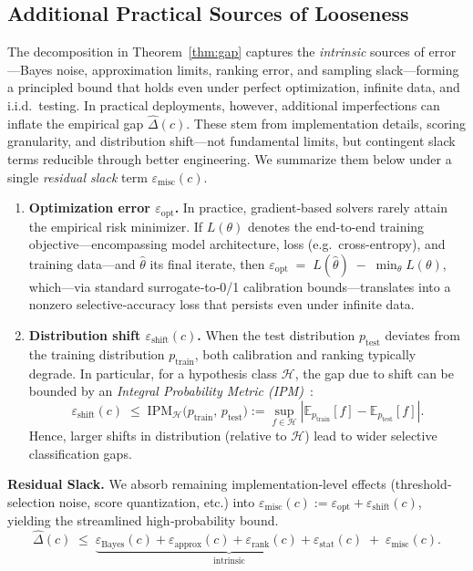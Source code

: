\subsection{Additional Practical Sources of Looseness}
\label{sec:extra-slack-short}
The decomposition in Theorem~\ref{thm:gap} captures the \emph{intrinsic} sources of error—Bayes noise, approximation limits, ranking error, and sampling slack—forming a principled bound that holds even under perfect optimization, infinite data, and i.i.d.\ testing. In practical deployments, however, additional imperfections can inflate the empirical gap \(\widehat{\Delta}(c)\). These stem from implementation details, scoring granularity, and distribution shift—not fundamental limits, but contingent slack terms reducible through better engineering. We summarize them below under a single \emph{residual slack} term \(\varepsilon_{\text{misc}}(c)\).
\begin{enumerate}
  \item \textbf{Optimization error \(\varepsilon_{\text{opt}}\).}  
    In practice, gradient‐based solvers rarely attain the empirical risk minimizer. If \(L(\theta)\) denotes the end-to-end training objective—encompassing model architecture, loss (e.g.\ cross-entropy), and training data—and \(\hat\theta\) its final iterate, then $\varepsilon_{\text{opt}}\;=\; L(\hat\theta) \;-\; \min_{\theta}L(\theta)$, which—via standard surrogate‐to‐0/1 calibration bounds—translates into a nonzero selective‐accuracy loss that persists even under infinite data.
  \item \textbf{Distribution shift \(\varepsilon_{\text{shift}}(c)\).}  
  When the test distribution \(p_{\mathrm{test}}\) deviates from the training distribution \(p_{\mathrm{train}}\), both calibration and ranking typically degrade. In particular, for a hypothesis class \(\mathcal{H}\), the gap due to shift can be bounded by an \emph{Integral Probability Metric (IPM)}~\citep{muller1997integral}:
  \begin{equation}
    \varepsilon_{\text{shift}}(c)\;\le\;\mathrm{IPM}_{\mathcal{H}}\bigl(p_{\mathrm{train}},\,p_{\mathrm{test}}\bigr)
    := \sup_{f \in \mathcal{H}} \left| \mathbb{E}_{p_{\mathrm{train}}}[f] - \mathbb{E}_{p_{\mathrm{test}}}[f] \right|.
  \end{equation}
  Hence, larger shifts in distribution (relative to \(\mathcal{H}\)) lead to wider selective classification gaps.
\end{enumerate}
\textbf{Residual Slack.}  We absorb remaining implementation‐level effects (threshold‐selection noise, score quantization, etc.) into $\varepsilon_{\text{misc}}(c) :=\varepsilon_{\text{opt}}+\varepsilon_{\text{shift}}(c)$, yielding the streamlined high‐probability bound.
\begin{equation}
  \widehat\Delta(c)
  \;\le\;
  \underbrace{\varepsilon_{\text{Bayes}}(c)
               +\varepsilon_{\text{approx}}(c)
               +\varepsilon_{\text{rank}}(c)
               +\varepsilon_{\text{stat}}(c)}_{\text{intrinsic}}
  \;+\;
  \varepsilon_{\text{misc}}(c).
\end{equation}

